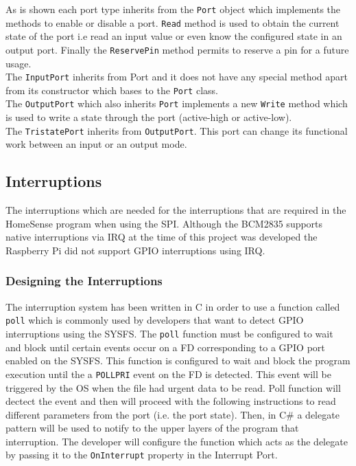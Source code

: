 As is shown each port type inherits from the \verb!Port! object which implements the methods to enable or disable a port. \verb!Read! method is used to obtain the current state of the port i.e read an input value or even know the configured state in an output port. Finally the \verb!ReservePin! method permits to reserve a pin for a future usage.
\\
The \verb!InputPort! inherits from Port and it does not have any special method apart from its constructor which bases to the \verb!Port! class. 
\\
The \verb!OutputPort! which also inherits \verb!Port! implements a new \verb!Write! method which is used to write a state through the port (active-high or active-low).
\\
The \verb!TristatePort! inherits from \verb!OutputPort!. This port can change its functional work between an input or an output mode.

\subsection{Interruptions}\label{SS:IOSharp-Interrupt}
The interruptions which are needed for the interruptions that are required in the HomeSense program when using the \gls{SPI}. Although the \gls{BCM2835} supports native interruptions via \gls{IRQ} at the time of this project was developed the Raspberry Pi did not support GPIO interruptions using \gls{IRQ}.

\subsubsection{Designing the Interruptions}\label{SSS:IOSharp-Interrupt-Design}
The interruption system has been written in C in order to use a function called \verb!poll! which is commonly used by developers that want to detect GPIO interruptions using the SYSFS. The \verb!poll! function must be configured to wait and block until certain events occur on a \gls{FD} corresponding to a GPIO port enabled on the SYSFS. This function is configured to wait and block the program execution until the a \verb!POLLPRI! event on the \gls{FD} is detected. This event will be triggered by the OS when the file had urgent data to be read. Poll function will dectect the event and then will proceed with the following instructions to read different parameters from the port (i.e. the port state). Then, in C\# a delegate pattern will be used to notify to the upper layers of the program that interruption. The developer will configure the function which acts as the delegate by passing it to the \verb!OnInterrupt! property in the Interrupt Port.

